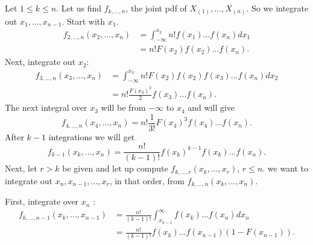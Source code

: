 Let $1 \le k \le  n$. Let us find $f_{k ,\ldots, n}$, the joint pdf of $X_{(1)} , \ldots , X_{(n)}$. So we integrate out $x_{1} , \ldots , x_{n-1}$. Start with $x_1$. 
\begin{align*}
	f_{2 ,\ldots,n }\left( x_{2} , \ldots , x_{n} \right) &= \int_{-\infty}^{x_2} n! f\left( x_1 \right) \ldots f\left( x_{n} \right) dx_1  \\
							      &= n! F\left( x_2 \right) f\left( x_2  \right) \ldots f\left( x_{n} \right) 
.\end{align*}
Next, integrate out $x_2$: 
\begin{align*}
	f_{3, \ldots, n}\left( x_{3} , \ldots , x_{n} \right) &= \int_{-\infty}^{x_{3}} n! F\left( x_2 \right) f\left( x_2 \right) f\left( x_3 \right) \ldots f\left( x_{n} \right) dx_{2}  \\
							      &= n! \frac{F\left( x_3 \right) ^2}{2}f\left( x_3 \right) \ldots f\left( x_{n} \right)
.\end{align*}
The next integral over $x_3$ will be from $-\infty$ to $x_4$ and will give 
\[
	f_{4, \ldots, n}\left( x_{4} , \ldots , x_{n} \right) = n!\frac{1}{3!} F\left( x_4 \right) ^3 f\left( x_4 \right) \ldots f\left( x_{n} \right) 
.\] 
After $k - 1$ integrations we will get 
 \[
	 f_{k - 1}\left( x_{k} , \ldots , x_{n} \right) = \frac{n!}{\left( k - 1 \right) !}f\left( x_{k} \right) ^{k - 1} f\left( x_{k} \right) \ldots f \left( x_{n} \right) 
.\] 
Next, let $r>k$ be given and let up compute $f_{k , \ldots, r}\left( x_{k} , \ldots , x_{r} \right) $, $r\le n$. we want to integrate out $x_{n}, x_{n-1} , \ldots , x_{r}$, in that order, from $f_{k , \ldots, n}\left( x_{k} , \ldots , x_{n} \right)$. 

First, integrate over $x_{n}$ : 
\begin{align*}
	f_{k , \ldots, n -1}\left( x_{k} , \ldots , x_{n-1} \right) &= \frac{n!}{\left( k - 1 \right) !}\int_{x_{n-1}}^{\infty} f\left( x_{k} \right) \ldots f\left( x_{n} \right) dx_{n}  \\
								    &= \frac{n!}{\left( k - 1 \right) !} f\left( x_{k} \right) \ldots f\left( x_{n-1} \right) \left( 1 - F\left( x_{n - 1} \right)  \right) 
.\end{align*}

